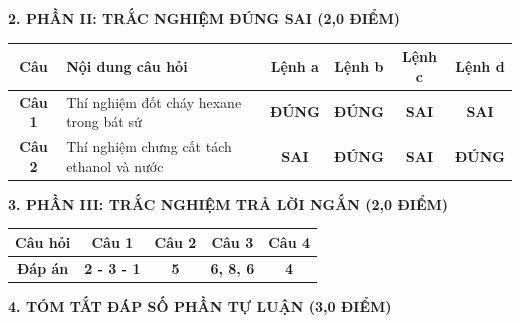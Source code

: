 \documentclass[11pt,a4paper]{article}
\begin{document}
\vspace{4pt}
{\bfseries\color{mainGreen} 2. PHẦN II: TRẮC NGHIỆM ĐÚNG SAI (2,0 ĐIỂM)}

\vspace{2pt}
\begin{center}
\renewcommand{\arraystretch}{1.2}
\begin{tabular}{|c|p{7.5cm}|c|c|c|c|}
\hline
\rowcolor{tableGreen}
\textbf{Câu} & \textbf{Nội dung câu hỏi} & \textbf{Lệnh a} & \textbf{Lệnh b} & \textbf{Lệnh c} & \textbf{Lệnh d} \\ \hline
\textbf{Câu 1} & Thí nghiệm đốt cháy hexane trong bát sứ & \textbf{\color{hfRed}ĐÚNG} & \textbf{\color{hfRed}ĐÚNG} & \textbf{SAI} & \textbf{SAI} \\ \hline
\textbf{Câu 2} & Thí nghiệm chưng cất tách ethanol và nước & \textbf{SAI} & \textbf{\color{hfRed}ĐÚNG} & \textbf{SAI} & \textbf{\color{hfRed}ĐÚNG} \\ \hline
\end{tabular}
\end{center}

\vspace{4pt}
{\bfseries\color{mainGreen} 3. PHẦN III: TRẮC NGHIỆM TRẢ LỜI NGẮN (2,0 ĐIỂM)}

\vspace{2pt}
\begin{center}
\renewcommand{\arraystretch}{1.2}
\begin{tabular}{|c|c|c|c|c|}
\hline
\rowcolor{tableGreen}
\textbf{Câu hỏi} & \textbf{Câu 1} & \textbf{Câu 2} & \textbf{Câu 3} & \textbf{Câu 4} \\ \hline
\textbf{Đáp án} & \textbf{\color{hfRed}2 - 3 - 1} & \textbf{\color{hfRed}5} & \textbf{\color{hfRed}6, 8, 6} & \textbf{\color{hfRed}4} \\ \hline
\end{tabular}
\end{center}

\vspace{4pt}
{\bfseries\color{mainGreen} 4. TÓM TẮT ĐÁP SỐ PHẦN TỰ LUẬN (3,0 ĐIỂM)}
\end{document}
